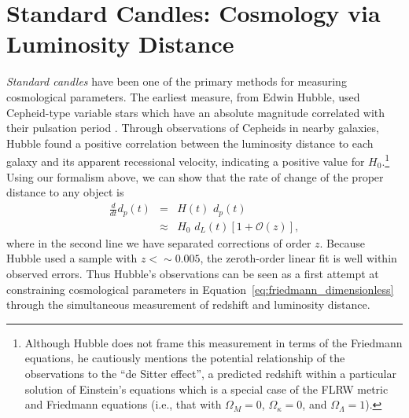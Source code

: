 \section{Standard Candles: Cosmology via Luminosity Distance}
\label{sec:std_candles}
{\it Standard candles} have been one of the primary methods for measuring
cosmological parameters.  The earliest measure, from Edwin Hubble,
used Cepheid-type variable stars which have an absolute magnitude correlated
with their pulsation period \citep{hubble1929}.
Through observations of Cepheids
in nearby galaxies, Hubble found a positive correlation between the
luminosity distance to each galaxy and its apparent recessional velocity,
indicating a positive value for $H_0$.\footnote{
Although Hubble does not frame this measurement in terms of the Friedmann
equations, he cautiously mentions the potential relationship of the
observations to the ``de Sitter effect'', a predicted redshift within
a particular solution of
Einstein's equations which is a special case of the FLRW metric and
Friedmann equations (i.e., that with $\Omega_M = 0$, $\Omega_\kappa = 0$,
and $\Omega_\Lambda = 1$).}
Using our formalism above, we can show that the rate of change of the
proper distance to any object is
\begin{eqnarray}
  \frac{d}{dt}d_p(t) &=& H(t)\,\, d_p(t) \nonumber\\
                     &\approx& H_0\,\, d_L(t) \left[1 + \mathcal{O}(z)\right],
\end{eqnarray}
where in the second line we have separated corrections of order $z$.  Because
Hubble used a sample with $z <\sim 0.005$, the zeroth-order
linear fit is well within observed errors.
Thus Hubble's observations can be seen as a first attempt at constraining
cosmological parameters in Equation~\ref{eq:friedmann_dimensionless} through
the simultaneous measurement of redshift and luminosity distance.

